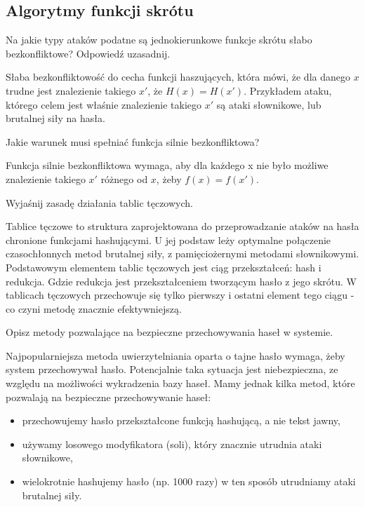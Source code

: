 \documentclass[answers,11pt]{exam}
\begin{document}
\subsection{Algorytmy funkcji skrótu}
\begin{questions}

\question Na jakie typy ataków podatne są jednokierunkowe funkcje skrótu słabo bezkonfliktowe? Odpowiedź uzasadnij.
\begin{solution}
Słaba bezkonfliktowość do cecha funkcji haszujących, która mówi, że dla danego $x$ trudne jest znalezienie takiego $x'$, że $H(x) = H(x')$.
Przykładem ataku, którego celem jest właśnie znalezienie takiego $x'$ są ataki słownikowe, lub brutalnej siły na hasła.
\end{solution}

\question Jakie warunek musi spełniać funkcja silnie bezkonfliktowa?
\begin{solution}
Funkcja silnie bezkonfliktowa wymaga, aby dla każdego x nie było możliwe znalezienie takiego $x'$ różnego od $x$, żeby $f(x) = f(x')$.
\end{solution}

\question Wyjaśnij zasadę działania tablic tęczowych.
\begin{solution}
Tablice tęczowe to struktura zaprojektowana do przeprowadzanie ataków na hasła chronione funkcjami hashującymi. U jej podstaw leży optymalne połączenie czasochłonnych metod brutalnej siły, z pamięciożernymi metodami słownikowymi. Podstawowym elementem tablic tęczowych jest ciąg przekształceń: hash i redukcja. Gdzie redukcja jest przekształceniem tworzącym hasło z jego skrótu. W tablicach tęczowych przechowuje się tylko pierwszy i ostatni element tego ciągu - co czyni metodę znacznie efektywniejszą.
\end{solution}

\question Opisz metody pozwalające na bezpieczne przechowywania haseł w systemie.
\begin{solution}
Najpopularniejsza metoda uwierzytelniania oparta o tajne hasło wymaga, żeby system przechowywał hasło. Potencjalnie taka sytuacja jest niebezpieczna, ze względu na możliwości wykradzenia bazy haseł. Mamy jednak kilka metod, które pozwalają na bezpieczne przechowywanie haseł:
\begin{itemize}
\item przechowujemy hasło przekształcone funkcją hashującą, a nie tekst jawny,
\item używamy losowego modyfikatora (soli), który znacznie utrudnia ataki słownikowe,
\item wielokrotnie hashujemy hasło (np. 1000 razy) w ten sposób utrudniamy ataki brutalnej siły.
\end{itemize}
\end{solution}


\end{questions}
\end{document}
